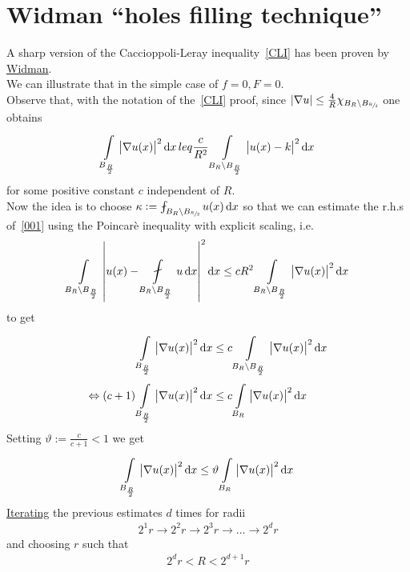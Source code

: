\section{Widman ``holes filling technique''}

A sharp version of the Caccioppoli-Leray inequality~\eqref{CLI} has been proven by \underline{Widman}.\\
We can illustrate that in the simple case of \(f=0, F=0\).\\
Observe that, with the notation of the~\eqref{CLI} proof, since \(\abs{\nabla u}\leq \frac{4}{R} \chi_{B_{R}\setminus B_{\sfrac{R}{2}}}\) one obtains
\begin{gather}
	\int\limits_{B_{\frac{R}{2}}}^{} \abs{\nabla u(x)}^{2} \dd{x} leq \frac{c}{R^{2}} \int\limits_{B_{R} \setminus B_{\frac{R}{2}}}^{} \abs{u(x)-k}^{2} \dd{x} \label{001}
\end{gather}
for some positive constant \(c\) independent of \(R\).\\
Now the idea is to choose \(\kappa := \fint_{B_{R}\setminus B_{\sfrac{R}{2}}} u(x) \dd{x}\) so that we can estimate the r.h.s of~\eqref{001} using the Poincarè inequality with explicit scaling, i.e.
\begin{gather}
	\int\limits_{B_{R}\setminus B_{\frac{R}{2}}}^{} \abs{u(x)-\fint\limits_{B_{R}\setminus B_{\frac{R}{2}}}^{} u \dd{x} }^{2} \dd{x} \leq cR^{2}\int\limits_{B_{R}\setminus B_{\frac{R}{2}}}^{} \abs{\nabla u(x)}^{2} \dd{x}
\end{gather}
to get
\begin{align}
	                       & \int\limits_{B_{\frac{R}{2}}}^{} \abs{\nabla u(x)}^{2} \dd{x} \leq c \int\limits_{B_{R}\setminus B_{\frac{R}{2}}}^{} \abs{\nabla u(x)}^{2} \dd{x}  \\
	\Leftrightarrow  (c+1) & \int\limits_{B_{\frac{R}{2}}}^{} \abs{\nabla u(x)}^{2} \dd{x} \leq c \int\limits_{B_{R}}^{} \abs{\nabla u(x)}^{2} \dd{x}
\end{align}
Setting \( \vartheta := \frac{c}{c+1}<1\) we get
\begin{gather}
	\int\limits_{B_{\frac{R}{2}}}^{} \abs{\nabla u(x)}^{2} \dd{x} \leq \vartheta \int\limits_{B_{R}}^{} \abs{\nabla u(x)}^{2} \dd{x}
\end{gather}
\underline{Iterating} the previous estimates \(d\) times for radii
\begin{gather}
	2^{1}r \to 2^{2}r \to 2^{3}r \to \dots \to 2^{d}r
\end{gather}
and choosing \(r\) such that
\begin{gather}
	2^{d}r < R< 2^{d+1}r \label{002}
\end{gather}
